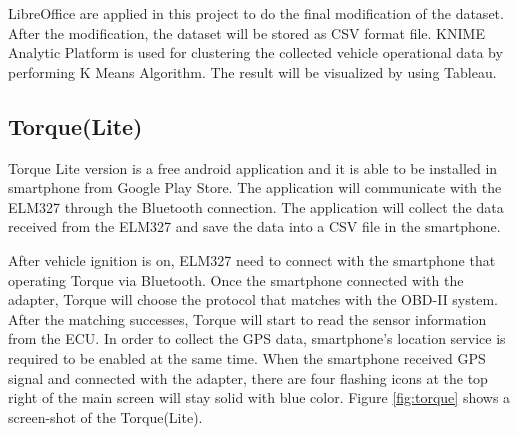 LibreOffice are applied in this project to do the final modification of the dataset. After the modification, the dataset will be stored as CSV format file. KNIME Analytic Platform is used for clustering the collected vehicle operational data by performing K Means Algorithm. The result will be visualized by using Tableau.

\subsection{Torque(Lite)}
Torque Lite version is a free android application and it is able to be installed in smartphone from Google Play Store. The application will communicate with the ELM327 through the Bluetooth connection. The application will collect the data received from the ELM327 and  save the data into a CSV file in the smartphone. 

After vehicle ignition is on, ELM327 need to connect with the smartphone that operating Torque via Bluetooth. Once the smartphone connected with the adapter, Torque will choose the protocol that matches with the OBD-II system. After the matching successes, Torque will start to read the sensor information from the ECU. In order to collect the GPS data, smartphone's location service is required to be enabled at the same time. When the smartphone received GPS signal and connected with the adapter, there are four flashing icons at the top right of the main screen will stay solid with blue color. Figure \ref{fig:torque} shows a screen-shot of the Torque(Lite).

